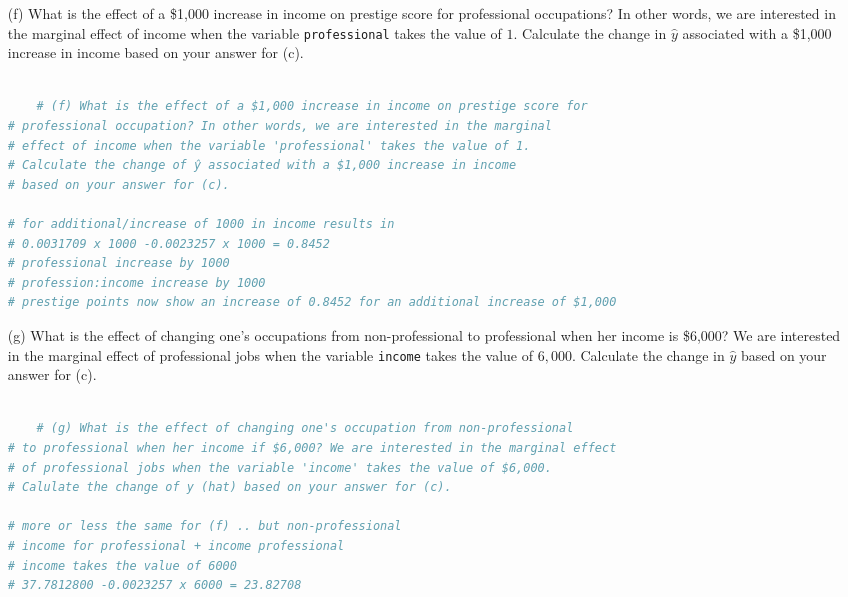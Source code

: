 \documentclass[12pt,letterpaper]{article}
\begin{document}
\begin{enumerate}
\begin{lstlisting}[language=R]
	\end{lstlisting}
	
	\newpage
	\item [(f)]
	What is the effect of a \$1,000 increase in income on prestige score for professional occupations? In other words, we are interested in the marginal effect of income when the variable \texttt{professional} takes the value of $1$. Calculate the change in $\hat{y}$ associated with a \$1,000 increase in income based on your answer for (c).
	
	\vspace{10cm}
	
	\begin{lstlisting}[language=R]
	
	# (f) What is the effect of a $1,000 increase in income on prestige score for
# professional occupation? In other words, we are interested in the marginal
# effect of income when the variable 'professional' takes the value of 1. 
# Calculate the change of ŷ associated with a $1,000 increase in income
# based on your answer for (c).

# for additional/increase of 1000 in income results in 
# 0.0031709 x 1000 -0.0023257 x 1000 = 0.8452 
# professional increase by 1000
# profession:income increase by 1000
# prestige points now show an increase of 0.8452 for an additional increase of $1,000
		\end{lstlisting}
	
	
	\item [(g)]
	What is the effect of changing one's occupations from non-professional to professional when her income is \$6,000? We are interested in the marginal effect of professional jobs when the variable \texttt{income} takes the value of $6,000$. Calculate the change in $\hat{y}$ based on your answer for (c).
	
	
	
	\begin{lstlisting}[language=R]
	
	# (g) What is the effect of changing one's occupation from non-professional 
# to professional when her income if $6,000? We are interested in the marginal effect
# of professional jobs when the variable 'income' takes the value of $6,000.
# Calulate the change of y (hat) based on your answer for (c).

# more or less the same for (f) .. but non-professional
# income for professional + income professional 
# income takes the value of 6000
# 37.7812800 -0.0023257 x 6000 = 23.82708
	
	\end{lstlisting}
	
\end{enumerate}
\end{document}

